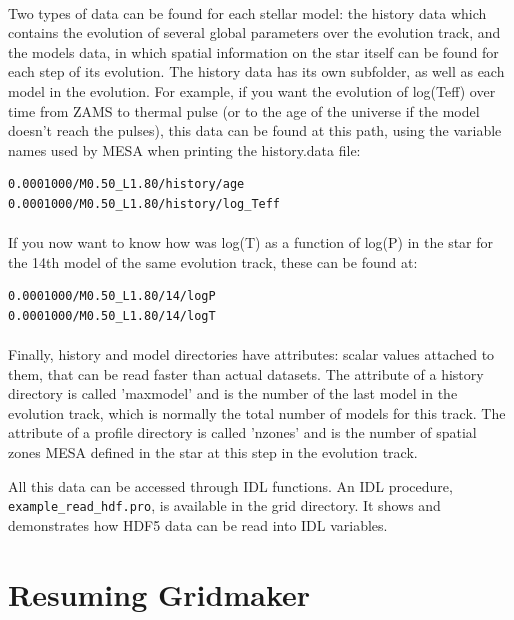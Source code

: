\documentclass{report}
\begin{document}
\paragraph{}Two types of data can be found for each stellar model: the history data which contains the evolution of several global parameters over the evolution track, and the models data, in which spatial information on the star itself can be found for each step of its evolution. The history data has its own subfolder, as well as each model in the evolution. For example, if you want the evolution of log(Teff) over time from ZAMS to thermal pulse (or to the age of the universe if the model doesn't reach the pulses), this data can be found at this path, using the variable names used by MESA when printing the history.data file: 
\begin{verbatim}
0.0001000/M0.50_L1.80/history/age
0.0001000/M0.50_L1.80/history/log_Teff
\end{verbatim}

\paragraph{}If you now want to know how was log(T) as a function of log(P) in the star for the 14th model of the same evolution track, these can be found at:
\begin{verbatim}
0.0001000/M0.50_L1.80/14/logP
0.0001000/M0.50_L1.80/14/logT
\end{verbatim}

\paragraph{}Finally, history and model directories have attributes: scalar values attached to them, that can be read faster than actual datasets. The attribute of a history directory is called 'maxmodel' and is the number of the last model in the evolution track, which is normally the total number of models for this track. The attribute of a profile directory is called 'nzones' and is the number of spatial zones MESA defined in the star at this step in the evolution track.

All this data can be accessed through IDL functions. An IDL procedure, \verb+example_read_hdf.pro+, is available in the grid directory. It shows and demonstrates how HDF5 data can be read into IDL variables.





\section{Resuming Gridmaker}
\end{document}
